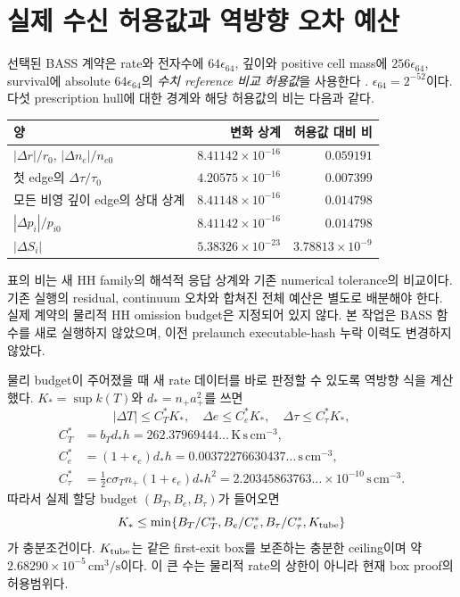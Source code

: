 \documentclass[11pt,a4paper]{article}
\begin{document}
\newpage
\section{실제 수신 허용값과 역방향 오차 예산}
선택된 BASS 계약은 rate와 전자수에 $64\epsilon_{64}$, 깊이와 positive cell mass에 $256\epsilon_{64}$, survival에 absolute $64\epsilon_{64}$의 \emph{수치 reference 비교 허용값}을 사용한다 \cite{bass}. $\epsilon_{64}=2^{-52}$이다. 다섯 prescription hull에 대한 경계와 해당 허용값의 비는 다음과 같다.
\begin{center}\begin{tabularx}{\linewidth}{@{}Xrr@{}}\toprule
양 & 변화 상계 & 허용값 대비 비\\\midrule
$|\Delta r|/r_0$, $|\Delta n_e|/n_{e0}$ & $8.41142\times10^{-16}$ & $0.059191$\\
첫 edge의 $\Delta\tau/\tau_0$ & $4.20575\times10^{-16}$ & $0.007399$\\
모든 비영 깊이 edge의 상대 상계 & $8.41148\times10^{-16}$ & $0.014798$\\
$|\Delta p_i|/p_{i0}$ & $8.41142\times10^{-16}$ & $0.014798$\\
$|\Delta S_i|$ & $5.38326\times10^{-23}$ & $3.78813\times10^{-9}$\\\bottomrule
\end{tabularx}\end{center}
표의 비는 새 HH family의 해석적 응답 상계와 기존 numerical tolerance의 비교이다. 기존 실행의 residual, continuum 오차와 합쳐진 전체 예산은 별도로 배분해야 한다. 실제 계약의 물리적 HH omission budget은 지정되어 있지 않다. 본 작업은 BASS 함수를 새로 실행하지 않았으며, 이전 prelaunch executable-hash 누락 이력도 변경하지 않았다.

물리 budget이 주어졌을 때 새 rate 데이터를 바로 판정할 수 있도록 역방향 식을 계산했다. $K_*=\sup k(T)$와 $d_*=n_+a_+^2$를 쓰면
\begin{equation}
|\Delta T|\le C_T^*K_*,\quad\Delta e\le C_e^*K_*,\quad\Delta\tau\le C_\tau^*K_*,
\end{equation}
\begin{align}
C_T^*&=b_Td_*h=262.37969444\ldots\,\mathrm{K\,s\,cm^{-3}},\\
C_e^*&=(1+\epsilon_e)d_*h=0.00372276630437\ldots\,\mathrm{s\,cm^{-3}},\\
C_\tau^*&=\tfrac12c\sigma_Tn_+(1+\epsilon_e)d_*h^2
=2.20345863763\ldots\times10^{-10}\,\mathrm{s\,cm^{-3}}.
\end{align}
따라서 실제 할당 budget $(B_T,B_e,B_\tau)$가 들어오면
\begin{equation}\label{eq:budget}
K_*\le\min\{B_T/C_T^*,B_e/C_e^*,B_\tau/C_\tau^*,K_{\rm tube}\}
\end{equation}
가 충분조건이다. $K_{\rm tube}$는 같은 first-exit box를 보존하는 충분한 ceiling이며 약 $2.68290\times10^{-5}\,\mathrm{cm^3/s}$이다. 이 큰 수는 물리적 rate의 상한이 아니라 현재 box proof의 허용범위다.
\end{document}
